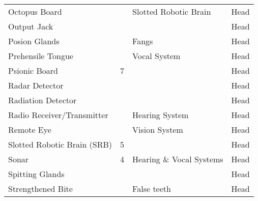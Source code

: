\documentclass[twoside]{book}
\begin{document}
\begin{longtable}{p{1.25in}p{2em}ll}
  \raggedright
           Octopus Board 
  &
  
  &
   Slotted Robotic Brain
           
  &
   Head 
  \tabularnewline
      
  \raggedright
           Output Jack 
  &
  
  &
  
  &
   Head 
  \tabularnewline
      
  \raggedright
           Posion Glands 
  &
  
  &
   Fangs 
  &
   Head 
  \tabularnewline
      
  \raggedright
           Prehensile Tongue 
  &
  
  &
   Vocal System 
  &
   Head 
  \tabularnewline
      
  \raggedright
           Psionic Board 
  &
   7 
  &
  
  &
   Head 
  \tabularnewline
      
  \raggedright
           Radar Detector 
  &
  
  &
  
  &
   Head 
  \tabularnewline
      
  \raggedright
           Radiation Detector 
  &
  
  &
  
  &
   Head 
  \tabularnewline
      
  \raggedright
           Radio Receiver/Transmitter
           
  &
  
  &
   Hearing System 
  &
   Head 
  \tabularnewline
      
  \raggedright
           Remote Eye 
  &
  
  &
   Vision System 
  &
   Head 
  \tabularnewline
      
  \raggedright
           Slotted Robotic Brain (SRB)
           
  &
   5 
  &
  
  &
   Head 
  \tabularnewline
      
  \raggedright
           Sonar 
  &
   4 
  &
   Hearing \& Vocal
           Systems 
  &
   Head 
  \tabularnewline
      
  \raggedright
           Spitting Glands 
  &
  
  &
  
  &
   Head 
  \tabularnewline
      
  \raggedright
           Strengthened Bite 
  &
  
  &
   False teeth 
  &
   Head 
  \tabularnewline
      

\end{longtable}
\end{document}
